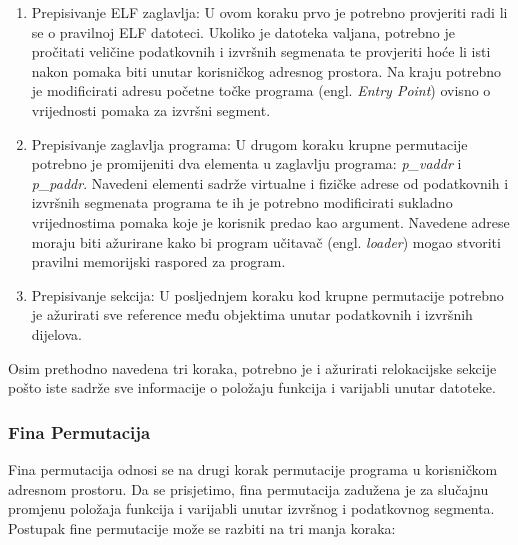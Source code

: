 \documentclass[times, utf8, diplomski, numeric]{fer}
\begin{document}
\begin{enumerate}
\item Prepisivanje ELF zaglavlja: U ovom koraku prvo je potrebno
provjeriti radi li se o pravilnoj ELF datoteci. Ukoliko je
datoteka valjana, potrebno je pročitati veličine podatkovnih i
izvršnih segmenata te provjeriti hoće li isti nakon pomaka biti
unutar korisničkog adresnog prostora. Na kraju potrebno je
modificirati adresu početne točke programa (engl. \emph{Entry
Point}) ovisno o vrijednosti pomaka za izvršni segment.

\item Prepisivanje zaglavlja programa: U drugom koraku krupne
permutacije potrebno je promijeniti dva elementa u zaglavlju
programa: \emph{p\_vaddr} i \emph{p\_paddr}. Navedeni elementi
sadrže virtualne i fizičke adrese od podatkovnih i izvršnih
segmenata programa te ih je potrebno modificirati sukladno
vrijednostima pomaka koje je korisnik predao kao argument.
Navedene adrese moraju biti ažurirane kako bi program učitavač
(engl. \emph{loader}) mogao stvoriti pravilni memorijski raspored
za program.

\item Prepisivanje sekcija: U posljednjem koraku kod krupne
permutacije potrebno je ažurirati sve reference među objektima
unutar podatkovnih i izvršnih dijelova. 
\end{enumerate}

Osim prethodno navedena tri koraka, potrebno je i ažurirati
relokacijske sekcije pošto iste sadrže sve informacije o položaju
funkcija i varijabli unutar datoteke.

\subsubsection{Fina Permutacija}

Fina permutacija odnosi se na drugi korak permutacije programa u
korisničkom adresnom prostoru. Da se prisjetimo, fina permutacija
zadužena je za slučajnu promjenu položaja funkcija i varijabli
unutar izvršnog i podatkovnog segmenta. Postupak fine permutacije
može se razbiti na tri manja koraka:
\end{document}
